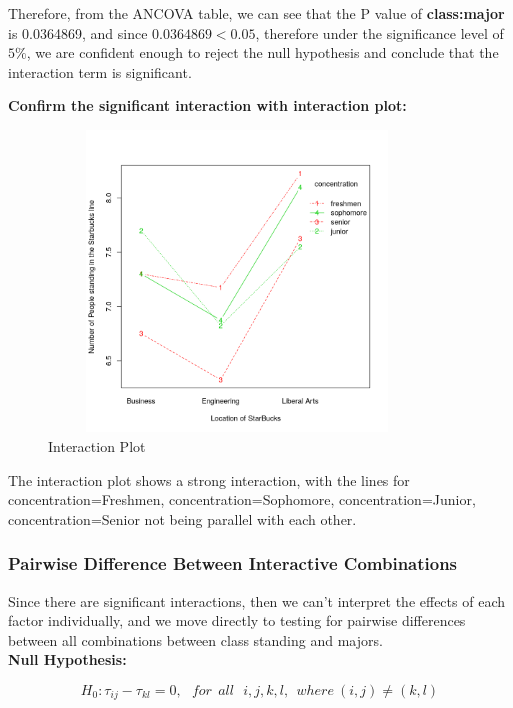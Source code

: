 \documentclass{article} %
\begin{document}
 Therefore, from the ANCOVA table, we can see that the P value of \textbf{class:major} is 0.0364869, and since $0.0364869 < 0.05$, therefore under the significance level of $5\%$, we are confident enough to reject the null hypothesis and conclude that the interaction term is significant.
\newpage

\textbf{Confirm the significant interaction with interaction plot:}

\begin{figure}[H]
	\begin{center}
		\includegraphics[height=8cm, width=10cm]{8.png}
	\end{center}
	\caption{Interaction Plot}
\end{figure}

The interaction plot shows a strong interaction, with the lines for concentration=Freshmen, concentration=Sophomore, concentration=Junior, concentration=Senior not being parallel with each other. 


\subsubsection{Pairwise Difference Between Interactive Combinations}

Since there are significant interactions, then we can't interpret the effects of each factor individually, and we move directly to testing for pairwise differences between all combinations between class standing and majors.\\


\textbf{Null Hypothesis:}

$$H_0 : \tau_{ij} - \tau_{kl} = 0, \:\:\: for \:\: all \:\:\: i, j, k, l, \:\: where \: (i,j) \neq (k,l)$$
\end{document}
